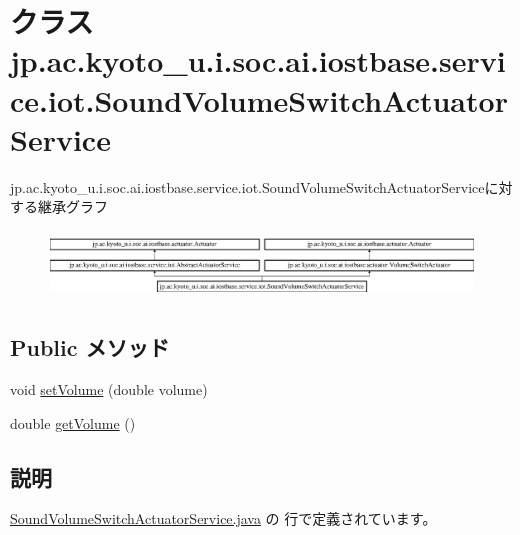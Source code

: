 \hypertarget{classjp_1_1ac_1_1kyoto__u_1_1i_1_1soc_1_1ai_1_1iostbase_1_1service_1_1iot_1_1_sound_volume_switch_actuator_service}{\section{クラス jp.\-ac.\-kyoto\-\_\-u.\-i.\-soc.\-ai.\-iostbase.\-service.\-iot.\-Sound\-Volume\-Switch\-Actuator\-Service}
\label{classjp_1_1ac_1_1kyoto__u_1_1i_1_1soc_1_1ai_1_1iostbase_1_1service_1_1iot_1_1_sound_volume_switch_actuator_service}
}
jp.\-ac.\-kyoto\-\_\-u.\-i.\-soc.\-ai.\-iostbase.\-service.\-iot.\-Sound\-Volume\-Switch\-Actuator\-Serviceに対する継承グラフ\begin{figure}[H]
\begin{center}
\leavevmode
\includegraphics[height=1.806452cm]{classjp_1_1ac_1_1kyoto__u_1_1i_1_1soc_1_1ai_1_1iostbase_1_1service_1_1iot_1_1_sound_volume_switch_actuator_service}
\end{center}
\end{figure}
\subsection*{Public メソッド}
\begin{DoxyCompactItemize}
\item 
void \hyperlink{classjp_1_1ac_1_1kyoto__u_1_1i_1_1soc_1_1ai_1_1iostbase_1_1service_1_1iot_1_1_sound_volume_switch_actuator_service_a20631b0e7e5e8531568d4752cab4940a}{set\-Volume} (double volume)
\item 
double \hyperlink{classjp_1_1ac_1_1kyoto__u_1_1i_1_1soc_1_1ai_1_1iostbase_1_1service_1_1iot_1_1_sound_volume_switch_actuator_service_a01d0ca1781f04d29b8032a89f16034b5}{get\-Volume} ()
\end{DoxyCompactItemize}


\subsection{説明}


 \hyperlink{_sound_volume_switch_actuator_service_8java_source}{Sound\-Volume\-Switch\-Actuator\-Service.\-java} の  行で定義されています。



